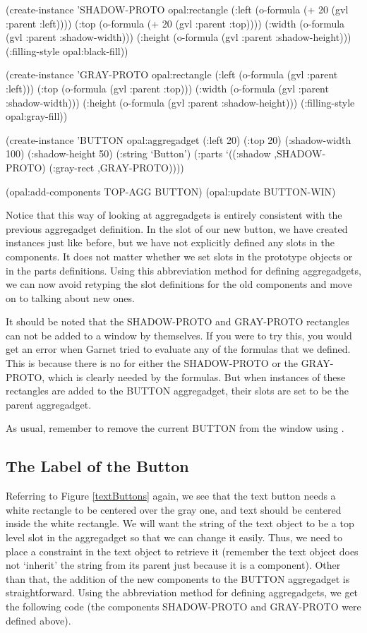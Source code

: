 \begin{programexample}
(create-instance 'SHADOW-PROTO opal:rectangle
   (:left (o-formula (+ 20 (gvl :parent :left))))
   (:top (o-formula (+ 20 (gvl :parent :top))))
   (:width (o-formula (gvl :parent :shadow-width)))
   (:height (o-formula (gvl :parent :shadow-height)))
   (:filling-style opal:black-fill))

(create-instance 'GRAY-PROTO opal:rectangle
   (:left (o-formula (gvl :parent :left)))
   (:top (o-formula (gvl :parent :top)))
   (:width (o-formula (gvl :parent :shadow-width)))
   (:height (o-formula (gvl :parent :shadow-height)))
   (:filling-style opal:gray-fill))

(create-instance 'BUTTON opal:aggregadget
   (:left 20) (:top 20)
   (:shadow-width 100) (:shadow-height 50)
   (:string `Button')
   (:parts
    `((:shadow ,SHADOW-PROTO)
      (:gray-rect ,GRAY-PROTO))))

(opal:add-components TOP-AGG BUTTON)
(opal:update BUTTON-WIN)
\end{programexample}


Notice that this way of looking at aggregadgets is entirely consistent
with the previous aggregadget definition.  In the  slot of
our new button, we have created instances just like before, but we
have not explicitly defined any slots in the components.  It does not matter
whether we set slots in the prototype objects or in the parts
definitions.  Using this abbreviation method for defining aggregadgets,
we can now avoid retyping the slot definitions for the old components
and move on to talking about new ones.

It should be noted that the SHADOW-PROTO and GRAY-PROTO rectangles can
not be added to a window by themselves.  If you were to try this, you
would get an error when Garnet tried to evaluate any of the formulas
that we defined.  This is because there is no  for either
the SHADOW-PROTO or the GRAY-PROTO, which is clearly needed by the
formulas.  But when instances of these rectangles are added to the BUTTON
aggregadget, their  slots are set to be the parent aggregadget.

As usual, remember to remove the current BUTTON from the window using
.


\subsection{The Label of the Button}

Referring to Figure \ref{textButtons} again, we see that the text
button needs a white rectangle to be centered over the gray one, and text
should be centered inside the white rectangle.  We will want the string of
the text object to be a top level slot in the aggregadget so that we
can change it easily.  Thus, we need to place a constraint in the text
object to retrieve it (remember the text object does not `inherit' the
string from its parent just because it is a component).  Other than
that, the addition of the new
components to the BUTTON aggregadget is straightforward.  Using the
abbreviation method for defining aggregadgets, we get the following code
(the components SHADOW-PROTO and GRAY-PROTO were defined above).

